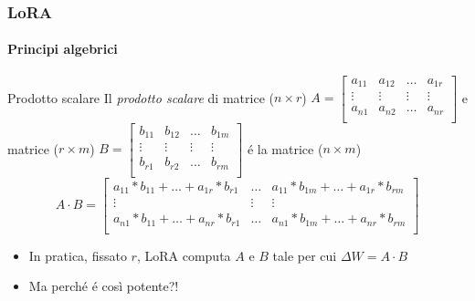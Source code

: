 %
\begin{frame}[t] \frametitle{LoRA}
\framesubtitle{Principi algebrici}
{\tiny
    \begin{minipage}[t]{\textwidth}
        \vspace*{-.5cm}
        \begin{block}{Prodotto scalare}
            Il \emph{prodotto scalare} di matrice ($n \times r$) $A = \begin{bmatrix}
                                                                            a_{11} & a_{12} & \ldots & a_{1r}\\
                                                                            \vdots & \vdots & \vdots & \vdots\\
                                                                            a_{n1} & a_{n2} & \ldots & a_{nr}\\
            \end{bmatrix}$ e matrice ($r \times m$)
            $B = \begin{bmatrix}
                     b_{11} & b_{12} & \ldots & b_{1m}\\
                     \vdots & \vdots & \vdots & \vdots\\
                     b_{r1} & b_{r2} & \ldots & b_{rm}\\
            \end{bmatrix}$ é la matrice ($n \times m$)
            \begin{displaymath}
                A\cdot B =
                \begin{bmatrix}
                    a_{11}*b_{11} + \ldots + a_{1r}*b_{r1}& \ldots & a_{11}*b_{1m} + \ldots + a_{1r}*b_{rm}\\
                    \vdots & \vdots & \vdots\\
                    a_{n1}*b_{11} + \ldots + a_{nr}*b_{r1}& \ldots & a_{n1}*b_{1m} + \ldots + a_{nr}*b_{rm}\\
                \end{bmatrix}
            \end{displaymath}
        \end{block}
    \end{minipage}
    \begin{minipage}[t]{\textwidth}
        \vspace*{.5cm}
        {\small
        \begin{itemize}[leftmargin=10pt,align=right]
            \item[\alert{\faArrowCircleRight}] In pratica, fissato $r$, LoRA computa $A$ e $B$ tale per cui $\Delta W = A\cdot B$
            \item[\alert{\faArrowCircleRight}] Ma perché é così potente?!
        \end{itemize}
        }
    \end{minipage}
}
\end{frame}
